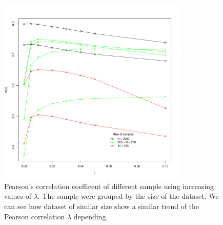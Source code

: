 \documentclass{bioinfo}
\begin{document}
\begin{application}
\begin{figure}[!tpb]
\centerline{\includegraphics[width=9cm]{fig/smm_mc_l005_ppc_size.pdf}}
\caption{Pearson's correlation coefficent of different sample using increasing values of $\lambda$. The sample were grouped by the size of the dataset. We can see how dataset of similar size show a similar trend of the Pearson correlation $\lambda$ depending.}
\label{fig:02}
\end{figure}








%
%
%
%
%






\end{application}
\end{document}

